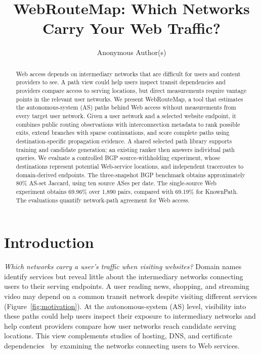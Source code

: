 \documentclass[sigconf,anonymous,review]{acmart}
\newcommand{\sys}{\mbox{WebRouteMap}\xspace}
\begin{document}
\title[WebRouteMap: Which Networks Carry Your Web Traffic?]{WebRouteMap: Which Networks Carry Your Web Traffic?}
\author{Anonymous Author(s)}

\begin{abstract}
Web access depends on intermediary networks that are difficult for users and
content providers to see. A path view could help users inspect transit
dependencies and providers compare access to serving locations, but direct
measurements require vantage points in the relevant user networks. We present
\sys, a tool that estimates the autonomous-system (AS) paths behind Web access
without measurements from every target user network. Given a user network and
a selected website endpoint, it combines public routing observations with
interconnection metadata to rank possible exits, extend branches with sparse
continuations, and score complete paths using destination-specific propagation
evidence. A shared selected path library supports training and candidate
generation; an existing ranker then answers individual path queries. We evaluate a controlled BGP
source-withholding experiment, whose destinations represent potential
Web-service locations, and independent traceroutes to domain-derived endpoints.
The three-snapshot BGP benchmark obtains approximately 80\% AS-set Jaccard,
using ten source ASes per date. The single-source Web experiment obtains 69.96\% over 1,890 pairs,
compared with 69.19\% for KnownPath. The evaluations quantify network-path agreement for Web access.
\end{abstract}

\maketitle

\section{Introduction}
\label{sec:introduction}

\emph{Which networks carry a user's traffic when visiting websites?} Domain
names identify services but reveal little about the intermediary networks
connecting users to their serving endpoints. A user reading news, shopping,
and streaming video may depend on a common transit network despite visiting
different services (Figure~\ref{fig:motivation}). At the autonomous-system
(AS) level, visibility into these paths could help users inspect their
exposure to intermediary networks and help content providers compare how
user networks reach candidate serving locations. This view complements
studies of hosting, DNS, and certificate
dependencies~\cite{kashaf2020dependencies,habib2025dependence} by examining
the networks connecting users to Web services.
\end{document}
